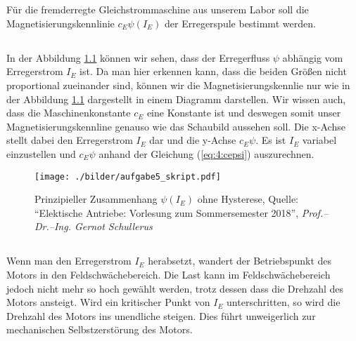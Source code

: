 \chapter{}
Für die fremderregte Gleichstrommaschine aus unserem Labor soll die Magnetisierungskennlinie $ c_{E}\psi(I_{E}) $ der Erregerspule bestimmt werden.
\section{}
In der Abbildung \ref{fig:5:skript} können wir sehen, dass der Erregerfluss $ \psi $ abhängig vom Erregerstrom $ I_{E} $ ist. Da man hier erkennen kann, dass die beiden Größen nicht proportional zueinander sind, können wir die Magnetisierungskennlie nur wie in der Abbildung \ref{fig:5:skript} dargestellt in einem Diagramm darstellen. Wir wissen auch, dass die Maschinenkonstante $ c_{E} $ eine Konstante ist und deswegen somit unser Magnetisierungskennline genauso wie das Schaubild aussehen soll. Die x-Achse stellt dabei den Erregerstrom $ I_{E} $ dar und die y-Achse $ c_{E}\psi $. Es ist $ I_{E} $ variabel einzustellen und $ c_{E}\psi $ anhand der Gleichung (\ref{eq:4:cepsi}) auszurechnen.

\begin{figure}[h]
	\centering
	\texttt{[image: ./bilder/aufgabe5\_skript.pdf]}
	\caption{Prinzipieller Zusammenhang $ \psi(I_{E}) $ ohne Hysterese, Quelle: \textquotedblleft Elektische Antriebe: Vorlesung zum Sommersemester 2018\textquotedblright, \textit{Prof.–Dr.–Ing. Gernot Schullerus}}
	\label{fig:5:skript}
\end{figure}


\section{}
Wenn man den Erregerstrom $ I_{E} $ herabsetzt, wandert der Betriebspunkt des Motors in den Feldschwächebereich. Die Last kann im Feldschwächebereich jedoch nicht mehr so hoch gewählt werden, trotz dessen dass die Drehzahl des Motors ansteigt. Wird ein kritischer Punkt von $ I_{E} $ unterschritten, so wird die Drehzahl des Motors ins unendliche steigen. Dies führt unweigerlich zur mechanischen Selbstzerstörung des Motors.


